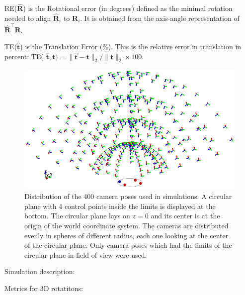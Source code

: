 \documentclass[letterpaper, 10 pt, conference]{ieeeconf}  %
\begin{document}
	RE($\hat{\textbf{R}}$) is the Rotational error (in degrees) defined as the minimal rotation needed to align $\hat{\textbf{R}}_i$ to $\textbf{R}_i$. It is obtained from the axis-angle representation of $\hat{\textbf{R}}^\top\textbf{R}$.
	
	TE($ \hat{\textbf{t}}$) is the Translation Error ($\%$). This is the relative error in translation in percent: TE( $\hat{\textbf{t} },\textbf{t}) = \|\hat{\textbf{t}} - \textbf{t}\|_2/\|\textbf{t}\|_2\times100$.
	
	\begin{figure}[t]
		\begin{center}
			\includegraphics[width=\columnwidth]{img/cam_config3D.png}
			\caption{\label{fig:homography_results} \small Distribution of the 400 camera poses used in simulations. A circular plane with 4 control points inside the limits is displayed at the bottom. The circular plane lays on $z=0$ and its center is at the origin of the world coordinate system. The cameras are distributed evenly in spheres of different radius, each one looking at the center of the circular plane. Only camera poses which had the limits of the circular plane in field of view were used.}
		\end{center}
	\end{figure}
	Simulation description:
	
	
	Metrics for 3D rotatitons:\cite{Huynh2009}
	
\end{document}
